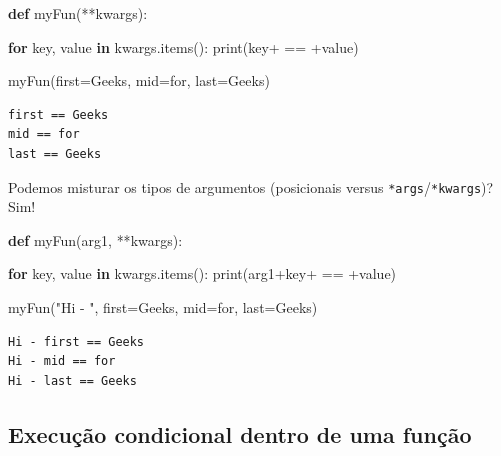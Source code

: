 \documentclass[
  brazilian,
  letterpaper,
  DIV=11,
  numbers=noendperiod]{scrreprt}
\newenvironment{Shaded}{\begin{snugshade}}{\end{snugshade}}
\newcommand{\BuiltInTok}[1]{\textcolor[rgb]{0.00,0.23,0.31}{#1}}
\newcommand{\ControlFlowTok}[1]{\textcolor[rgb]{0.00,0.23,0.31}{\textbf{#1}}}
\newcommand{\KeywordTok}[1]{\textcolor[rgb]{0.00,0.23,0.31}{\textbf{#1}}}
\newcommand{\NormalTok}[1]{\textcolor[rgb]{0.00,0.23,0.31}{#1}}
\newcommand{\OperatorTok}[1]{\textcolor[rgb]{0.37,0.37,0.37}{#1}}
\newcommand{\StringTok}[1]{\textcolor[rgb]{0.13,0.47,0.30}{#1}}
\begin{document}
\begin{Shaded}
\begin{Highlighting}[]
\KeywordTok{def}\NormalTok{ myFun(}\OperatorTok{**}\NormalTok{kwargs):}
    
    \ControlFlowTok{for}\NormalTok{ key, value }\KeywordTok{in}\NormalTok{ kwargs.items():}
        \BuiltInTok{print}\NormalTok{(key}\OperatorTok{+}\StringTok{\textquotesingle{} == \textquotesingle{}}\OperatorTok{+}\NormalTok{value)}
  
\NormalTok{myFun(first}\OperatorTok{=}\StringTok{\textquotesingle{}Geeks\textquotesingle{}}\NormalTok{, mid}\OperatorTok{=}\StringTok{\textquotesingle{}for\textquotesingle{}}\NormalTok{, last}\OperatorTok{=}\StringTok{\textquotesingle{}Geeks\textquotesingle{}}\NormalTok{)}
\end{Highlighting}
\end{Shaded}

\begin{verbatim}
first == Geeks
mid == for
last == Geeks
\end{verbatim}

Podemos misturar os tipos de argumentos (posicionais versus
\texttt{*args}/\texttt{*kwargs})? Sim!

\begin{Shaded}
\begin{Highlighting}[]
\KeywordTok{def}\NormalTok{ myFun(arg1, }\OperatorTok{**}\NormalTok{kwargs):}
    
    \ControlFlowTok{for}\NormalTok{ key, value }\KeywordTok{in}\NormalTok{ kwargs.items():}
        \BuiltInTok{print}\NormalTok{(arg1}\OperatorTok{+}\NormalTok{key}\OperatorTok{+}\StringTok{\textquotesingle{} == \textquotesingle{}}\OperatorTok{+}\NormalTok{value)}
  
\NormalTok{myFun(}\StringTok{"Hi {-} "}\NormalTok{, first}\OperatorTok{=}\StringTok{\textquotesingle{}Geeks\textquotesingle{}}\NormalTok{, mid}\OperatorTok{=}\StringTok{\textquotesingle{}for\textquotesingle{}}\NormalTok{, last}\OperatorTok{=}\StringTok{\textquotesingle{}Geeks\textquotesingle{}}\NormalTok{)}
\end{Highlighting}
\end{Shaded}

\begin{verbatim}
Hi - first == Geeks
Hi - mid == for
Hi - last == Geeks
\end{verbatim}

\subsection{Execução condicional dentro de uma
função}\label{execuuxe7uxe3o-condicional-dentro-de-uma-funuxe7uxe3o}
\end{document}
